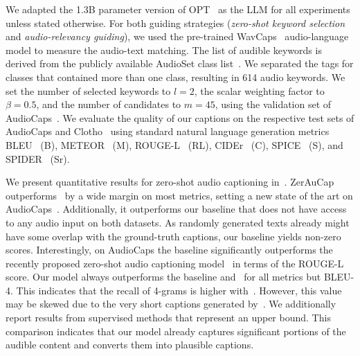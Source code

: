 \documentclass{article}
\newcommand{\modelName}{ZerAuCap\xspace}
\newcommand{\mypara}[1]{\vspace{2pt}\noindent{\bf{#1}}}
\begin{document}
\mypara{Experimental setup.}
We adapted the 1.3B parameter version of OPT~\cite{zhang2022opt} as the LLM for all experiments unless stated otherwise. For both guiding strategies (\emph{zero-shot keyword selection} and \emph{audio-relevancy guiding}), we used the pre-trained WavCaps~\cite{Mei2023WavCapsAC} audio-language model to measure the audio-text matching.
The list of audible keywords is derived from the publicly available AudioSet class list~\cite{Gemmeke2017AudioSA}. We separated the tags for classes that contained more than one class, resulting in 614 audio keywords.
We set the number of selected keywords to $l=2$, the scalar weighting factor to $\beta=0.5$, and the number of candidates to $m=45$, using the validation set of AudioCaps~\cite{kim2019audiocaps}.
We evaluate the quality of our captions on the respective test sets of AudioCaps and Clotho~\cite{drossos2020clotho} using standard natural language generation metrics BLEU~\cite{papineni2001BLEUMethodAutomatic} (B), METEOR~\cite{banerjee2005METEORAutomaticMetric} (M), ROUGE-L~\cite{lin2004ROUGEPackageAutomatic} (RL), CIDEr~\cite{vedantam2015CIDErConsensusbased} (C), SPICE~\cite{anderson2016spice} (S), and SPIDER~\cite{liu2017spider} (Sr).




\mypara{Quantitative results.}
We present quantitative results for zero-shot audio captioning in~. \modelName outperforms~\cite{shaharabany2023zero} by a wide margin on most metrics, setting a new state of the art on AudioCaps~\cite{kim2019audiocaps}.
Additionally, it outperforms our baseline that does not have access to any audio input on both datasets. As randomly generated texts already might have some overlap with the ground-truth captions, our baseline yields non-zero scores. Interestingly, on AudioCaps the baseline significantly outperforms the recently proposed zero-shot audio captioning model~\cite{shaharabany2023zero} in terms of the ROUGE-L score.
Our model always outperforms the baseline and~\cite{shaharabany2023zero} for all metrics but BLEU-4\@. This indicates that the recall of 4-grams is higher with~\cite{shaharabany2023zero}. However, this value may be skewed due to the very short captions generated by~\cite{shaharabany2023zero}.
We additionally report results from supervised methods that represent an upper bound. This comparison indicates that our model already captures significant portions of the audible content and converts them into plausible captions.
\end{document}

